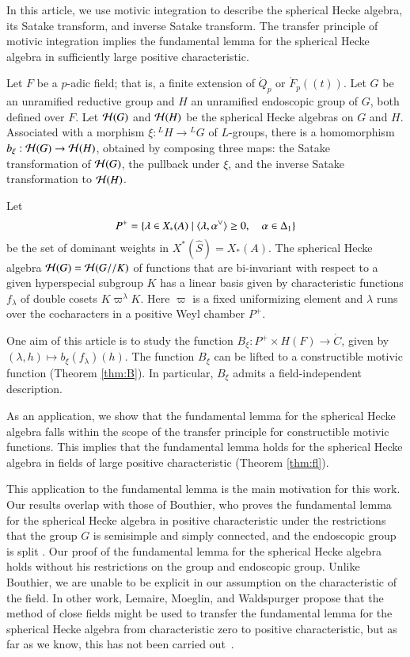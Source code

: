 \newpage

In this article, we use motivic integration to describe the spherical
Hecke algebra, its Satake transform, and inverse Satake transform.
The transfer principle of motivic integration implies the fundamental
lemma for the spherical Hecke algebra in sufficiently large positive characteristic.

Let $F$ be a $p$-adic field; that is, a finite extension of $\ring{Q}_p$ or $\ring{F}_p((t))$.
Let $G$ be an unramified reductive group and $H$ an unramified endoscopic group of $G$, both defined over $F$.
Let $\mathcal H(G)$ and $\mathcal H(H)$ be the spherical Hecke algebras on $G$ and $H$.
Associated with  a morphism $\xi:{}^LH\to {}^LG$ of $L$-groups, there is a homomorphism
$b_\xi:\mathcal H(G)\to \mathcal H(H)$, obtained by composing three maps: the Satake transformation of $\mathcal H(G)$,
the pullback under $\xi$, and the inverse Satake transformation to $\mathcal H(H)$.

Let 
\[
P^+ = \{\lambda\in X_*(A) \mid \langle{\lambda,\alpha^\vee}\rangle\ge 0,\quad \alpha\in \Delta_1\}
\]
be the set of dominant weights in $X^*(\hat S)=X_*(A)$.
The spherical Hecke algebra $\mathcal H(G)=\mathcal H(G//K)$ of functions that are bi-invariant with respect
to a given hyperspecial subgroup $K$ has a linear basis given by characteristic functions $f_\lambda$
of double cosets $K\varpi^\lambda K$.  Here $\varpi$ is a fixed uniformizing element and $\lambda$
runs over the cocharacters in a positive Weyl chamber $P^+$.

One aim of this article is to study the function $B_\xi:P^+\times H(F)\to \ring{C}$, given by
$(\lambda,h)\mapsto b_\xi(f_\lambda)(h)$.   The function $B_\xi$ can be lifted to a constructible motivic
function (Theorem \ref{thm:B}).   In particular, $B_\xi$ admits a field-independent description.  

As an application, we show that the fundamental lemma for the spherical Hecke algebra falls within
the scope of the transfer principle for constructible motivic functions.
This implies that the fundamental lemma holds for the spherical Hecke algebra in fields of large positive
characteristic (Theorem \ref{thm:fl}).

This application to the fundamental lemma is the main motivation for this work.  Our results overlap with
those of Bouthier, who proves the fundamental lemma for the spherical Hecke algebra in positive
characteristic under the restrictions that the group $G$ is semisimple and simply connected, 
and the endoscopic group is split \cite[Theorem~0.2]{bouthier}.  Our proof of the fundamental lemma for the
spherical Hecke algebra holds without his restrictions on the group and endoscopic group.
Unlike Bouthier, we are unable to be explicit in our assumption
on the characteristic of the field.  In other work,
Lemaire, Moeglin, and Waldspurger propose that the method of close fields might be used to transfer the
fundamental lemma for the spherical Hecke algebra from characteristic zero to positive characteristic, but as far as we know, 
this has not been
carried out~\cite[\S1.3]{LMW}.

